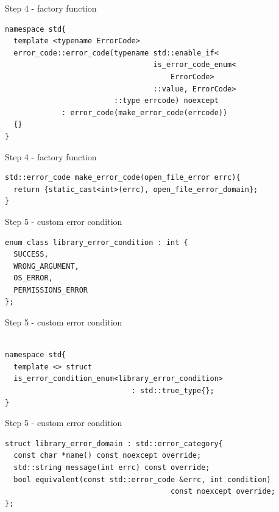 \documentclass[10pt]{beamer}
\begin{document}
\begin{frame}[fragile]{Step 4 - factory function}

	\begin{verbatim}
namespace std{
  template <typename ErrorCode>
  error_code::error_code(typename std::enable_if<
                                  is_error_code_enum<
                                      ErrorCode>
                                  ::value, ErrorCode>
                         ::type errcode) noexcept 
             : error_code(make_error_code(errcode))
  {}
}
	\end{verbatim}
	
\end{frame}

\begin{frame}[fragile]{Step 4 - factory function}
	\begin{verbatim}
std::error_code make_error_code(open_file_error errc){
  return {static_cast<int>(errc), open_file_error_domain};
}
	\end{verbatim}
\end{frame}

\begin{frame}[fragile]{Step 5 - custom error condition}
	\begin{verbatim}
enum class library_error_condition : int {
  SUCCESS,
  WRONG_ARGUMENT,
  OS_ERROR,
  PERMISSIONS_ERROR
};
	\end{verbatim}
\end{frame}

\begin{frame}[fragile]{Step 5 - custom error condition}
	\begin{verbatim}

namespace std{
  template <> struct
  is_error_condition_enum<library_error_condition>
                             : std::true_type{};
}
	\end{verbatim}
\end{frame}

\begin{frame}[fragile]{Step 5 - custom error condition}
	\begin{verbatim}
struct library_error_domain : std::error_category{
  const char *name() const noexcept override;
  std::string message(int errc) const override;
  bool equivalent(const std::error_code &errc, int condition) 
                                      const noexcept override;
};
	\end{verbatim}
\end{frame}
\end{document}
